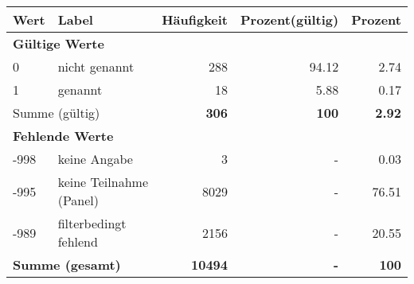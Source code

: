      \begin{longtable}{lXrrr}
     \toprule
     \textbf{Wert} & \textbf{Label} & \textbf{Häufigkeit} & \textbf{Prozent(gültig)} & \textbf{Prozent} \\
     \endhead
     \midrule
     \multicolumn{5}{l}{\textbf{Gültige Werte}}\\

     0 &
     \multicolumn{1}{X}{ nicht genannt   } &


       \num{288} &
       \num[round-mode=places,round-precision=2]{94.12} &
         \num[round-mode=places,round-precision=2]{2.74} \\

     1 &
     \multicolumn{1}{X}{ genannt   } &


       \num{18} &
       \num[round-mode=places,round-precision=2]{5.88} &
         \num[round-mode=places,round-precision=2]{0.17} \\
     \midrule
     \multicolumn{2}{l}{Summe (gültig)} &
       \textbf{\num{306}} &
     \textbf{\num{100}} &
       \textbf{\num[round-mode=places,round-precision=2]{2.92}} \\
     \multicolumn{5}{l}{\textbf{Fehlende Werte}}\\
       -998 &
       keine Angabe &
         \num{3} &
        - &
         \num[round-mode=places,round-precision=2]{0.03} \\
       -995 &
       keine Teilnahme (Panel) &
         \num{8029} &
        - &
         \num[round-mode=places,round-precision=2]{76.51} \\
       -989 &
       filterbedingt fehlend &
         \num{2156} &
        - &
         \num[round-mode=places,round-precision=2]{20.55} \\
     \midrule
     \multicolumn{2}{l}{\textbf{Summe (gesamt)}} &
          \textbf{\num{10494}} &
        \textbf{-} &
        \textbf{\num{100}} \\
     \bottomrule
     \end{longtable}
     
